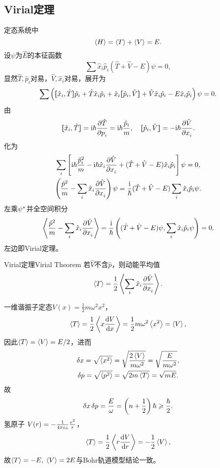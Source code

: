 \subsection{Virial定理}
定态系统中
\[
	\ave H=\ave T+\ave V=E.
\]
设$\psi$为$\hat E$的本征函数
\[
	\sum\hat x_i\hat p_i(\hat T+\hat V-E)\psi=0,
\]
显然$\hat T,\hat p_i$对易，$\hat V,\hat x_i$对易，展开为
\[
	\sum \kh{\cmm{x_i}T\hat p_i+\hat T\hat x_i\hat p_i+\hat x_i\cmm{p_i}V+\hat V\hat x_i\hat p_i-E\hat x_i\hat p_i}\psi=0.
\]
由
\[
	\cmm{x_i}T=\i\hbar\pv{\hat T}{p_i}=\i\hbar\frac{\hat p_i}m,\quad \cmm{p_i}V=-\i\hbar\pv{\hat V}{x_i}.
\]
化为
\begin{gather*}
	\sum_i\fkh{\i\hbar\frac{\hat p_i^2}m-\i\hbar\hat x_i\pv{\hat V}{x_i}+(\hat T+\hat V-E)\hat x_i\hat p_i}\psi=0,\\
	\kh{\frac{\hat p^2}m-\sum_i\hat x_i\pv{\hat V}{x_i}}\psi=\frac\i\hbar(\hat T+\hat V-E)\sum_i\hat x_i\hat p_i\psi.
\end{gather*}
左乘$\psi\cj$并全空间积分
\[
	\ave{\frac{\hat p^2}m-\sum_i\hat x_i\pv{\hat V}{x_i}}=\frac\i\hbar\kh{(\hat T+\hat V-E)\psi,\sum_i\hat x_i\hat p_i\psi}=0.
\]
左边即Virial定理。
\begin{theorem}{Virial定理}{Virial Theorem}
	若$\hat V$不含$\hat p$，则动能平均值
	\begin{align}
		\ave T=\frac12\ave{\sum_i\hat x_i\pv{\hat V}{x_i}}.
	\end{align}
\end{theorem}
\eg[1]一维谐振子定态$V(x)=\frac12m\omega^2x^2$，
\[
	\ave T=\frac12\ave{x\dv Vx}=\frac12m\omega^2\ave{x^2}=\ave V,
\]
因此$\ave T=\ave V=E/2$，进而
\begin{gather*}
	\delta x=\sqrt{\ave{x^2}}=\sqrt{\frac{2\ave V}{m\omega^2}}=\sqrt{\frac E{m\omega^2}},\\
	\delta p=\sqrt{\ave{p^2}}=\sqrt{2m\ave T}=\sqrt{mE}.
\end{gather*}
故
\[
	\delta x\,\delta p=\frac E\omega=\kh{n+\frac12}\hbar\geqslant\frac\hbar{2}.
\]
\eg[2]氢原子 $V(r)=-\frac1{4\pi\ve_0}\frac{e^2}r$，
\[
	\ave T=\frac12\ave{r\dv Vr}=-\frac12\ave V,
\]
故$\ave T=-E,\;\ave V=2E$与Bohr轨道模型结论一致。
